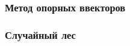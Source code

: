 \subsubsection{Метод опорных ввекторов}
















\subsubsection{Случайный лес}
























